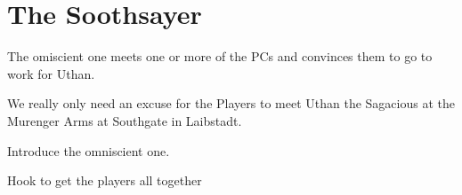 \documentclass[a4paper]{dnd5}
\begin{document}
\section*{The Soothsayer}

\begin{precis}
\item The omiscient one meets one or more of the PCs and convinces them to go to work for Uthan.
\end{precis}

\begin{outs} 
\item We really only need an excuse for the Players to meet Uthan the Sagacious at the Murenger Arms at Southgate in Laibstadt.
\end{outs}

\begin{purpose}
\item Introduce the omniscient one.
\item Hook to get the players all together
\end{purpose}     
\end{document}
